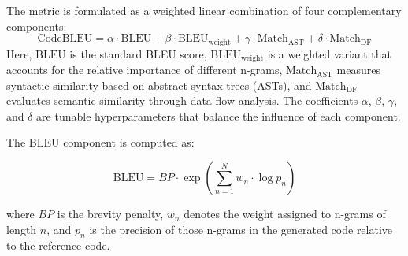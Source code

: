 The metric is formulated as a weighted linear combination of four complementary components:
\begin{equation}
    \text{CodeBLEU} = \alpha \cdot \text{BLEU} + \beta \cdot \text{BLEU}_{\text{weight}} + \gamma \cdot \text{Match}_{\text{AST}} + \delta \cdot \text{Match}_{\text{DF}}
\end{equation}
Here, \(\text{BLEU}\) is the standard BLEU score, \(\text{BLEU}_{\text{weight}}\) is a weighted variant that accounts for the relative importance of different n-grams, \(\text{Match}_{\text{AST}}\) measures syntactic similarity based on abstract syntax trees (ASTs), and \(\text{Match}_{\text{DF}}\) evaluates semantic similarity through data flow analysis. The coefficients \(\alpha\), \(\beta\), \(\gamma\), and \(\delta\) are tunable hyperparameters that balance the influence of each component.

The BLEU component is computed as:

\begin{equation}
    \text{BLEU} = BP \cdot \exp\left(\sum_{n=1}^{N} w_n \cdot \log p_n\right)
\end{equation}

where \(BP\) is the brevity penalty, \(w_n\) denotes the weight assigned to n-grams of length \(n\), and \(p_n\) is the precision of those n-grams in the generated code relative to the reference code.








